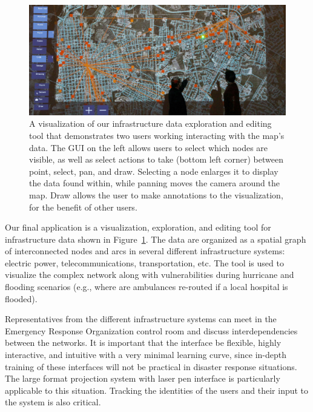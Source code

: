\documentclass[review]{vgtc}                 %
\begin{document}
\begin{figure}[t]
  \begin{center}
  \begin{minipage}{0.99\linewidth}
    \includegraphics[width=0.99\linewidth]{images/synenv_crop.jpg}   
  \end{minipage}
  \end{center}
  \caption{\label{figure:synenv} A visualization of our infrastructure data exploration and editing tool that 
demonstrates two users working interacting with the map's data. The GUI on the left allows users to select 
which nodes are visible, as well as select actions to take (bottom left corner) between point, select, pan, 
and draw. Selecting a node enlarges it to display the data found within, while panning moves the camera around 
the map. Draw allows the user to make annotations to the visualization, for the benefit of other users. }
\end{figure}


Our final application is a visualization, exploration, and editing tool for
infrastructure data shown in Figure~\ref{figure:synenv}.
The data are organized as a spatial graph of interconnected nodes and arcs in several different infrastructure 
systems: electric power, telecommunications, transportation, etc. The tool is used to visualize the complex 
network along with vulnerabilities during hurricane and flooding scenarios (e.g., where are ambulances re-routed 
if a local hospital is flooded). 

Representatives from the different infrastructure systems
can meet in the Emergency Response Organization control room and discuss
interdependencies between the networks.  It is important that the
interface be ﬂexible, highly interactive, and intuitive 
with a very minimal learning curve, since
in-depth training of these interfaces will not be practical in
disaster response situations.  The large format projection system with
laser pen interface is particularly applicable to this situation.
Tracking the identities of the users and their input to the system is
also critical.
\end{document}
